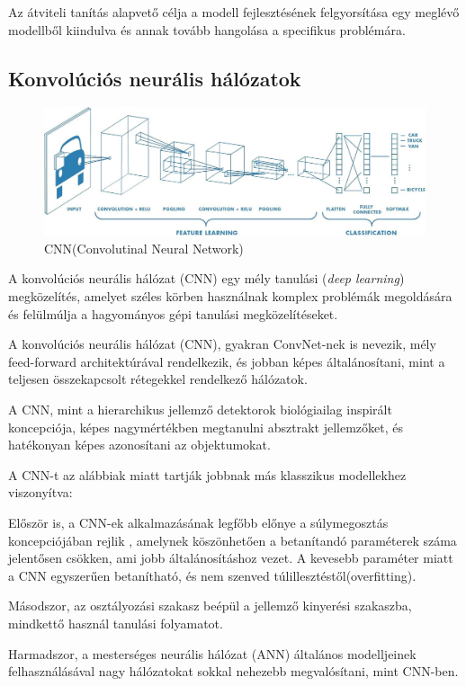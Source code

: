 \documentclass[12pt,a4]{article}
\begin{document}
     Az átviteli tanítás alapvető célja a modell fejlesztésének felgyorsítása egy meglévő modellből kiindulva és annak tovább hangolása a specifikus problémára.
 
	\subsection{Konvolúciós neurális hálózatok}
	\begin{figure}[h]	
		\centering
		\includegraphics[width=1\linewidth]{CNN}
		\caption{CNN(Convolutinal Neural Network)}
	\end{figure}
	
	A konvolúciós neurális hálózat (CNN) \cite{CNN} egy
	mély tanulási (\textit{deep learning}) megközelítés, amelyet széles körben használnak komplex problémák megoldására és felülmúlja a hagyományos gépi
	tanulási megközelítéseket.
	
	A konvolúciós neurális hálózat (CNN), gyakran ConvNet-nek is nevezik, mély feed-forward architektúrával rendelkezik, és jobban képes általánosítani, mint a teljesen összekapcsolt rétegekkel rendelkező hálózatok.
	
	A CNN, mint a hierarchikus jellemző detektorok biológiailag inspirált koncepciója, képes nagymértékben megtanulni
	absztrakt jellemzőket, és hatékonyan képes azonosítani az objektumokat.
	
	A CNN-t az alábbiak miatt tartják jobbnak más klasszikus modellekhez viszonyítva:
	
	Először is, a CNN-ek alkalmazásának legfőbb előnye a súlymegosztás koncepciójában rejlik
	, amelynek köszönhetően a betanítandó paraméterek száma jelentősen csökken, ami  jobb általánosításhoz vezet. 
	A kevesebb paraméter miatt a CNN egyszerűen betanítható, és nem szenved túlillesztéstől(overfitting).
	
	
	Másodszor, az osztályozási szakasz beépül a jellemző kinyerési szakaszba, mindkettő használ tanulási folyamatot.
	
	
	Harmadszor, a mesterséges neurális hálózat (ANN) általános modelljeinek felhasználásával nagy hálózatokat sokkal nehezebb megvalósítani,
	mint CNN-ben.
	
\end{document}
